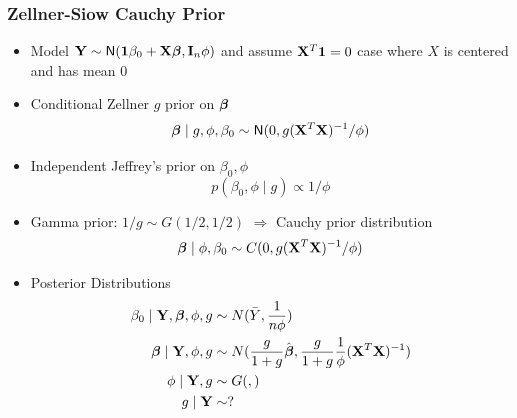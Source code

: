 \documentclass[handout]{beamer}\usepackage[]{graphicx}\usepackage[]{color}
\begin{document}
\begin{frame} \frametitle{Zellner-Siow Cauchy Prior}

\begin{itemize}
\item Model $\mathbf{Y} \sim \textsf{N}( \mathbf{1} \beta_0 + \mathbf{X} \boldsymbol{\beta} , \mathbf{I}_n\phi)$ and assume $\mathbf{X}^T\mathbf{1} = 0$  case where $X$ is centered and has mean 0
\item Conditional Zellner $g$ prior on $\boldsymbol{\beta}$
$$\boldsymbol{\beta} \mid g, \phi, \beta_0 \sim \textsf{N}(0, g (\mathbf{X}^T\mathbf{X})^{-1}/\phi)$$
\item Independent Jeffrey's prior on $\beta_0, \phi$
$$p(\beta_0, \phi \mid g) \propto 1/\phi$$

\item Gamma prior: $1/g \sim G(1/2, 1/2)$ $\Rightarrow$ Cauchy prior distribution
$$\boldsymbol{\beta} \mid  \phi, \beta_0 \sim C(0, g (\mathbf{X}^T\mathbf{X})^{-1}/\phi)$$

\item Posterior Distributions
\begin{align*}
\beta_0 \mid \mathbf{Y}, \boldsymbol{\beta}, \phi, g & \sim N(\bar{Y}, \frac{1}{n \phi}) \\
\boldsymbol{\beta} \mid \mathbf{Y}, \phi, g  & \sim N( \frac{g}{1+g} \hat{\boldsymbol{\beta}},  \frac{g}{1+g} \frac{1}{\phi} (\mathbf{X}^T\mathbf{X})^{-1} ) \\
\phi \mid \mathbf{Y}, g  & \sim G( , ) \\
g \mid \mathbf{Y} & \sim  ?
\end{align*}
\end{itemize}
\end{frame}
\end{document}
